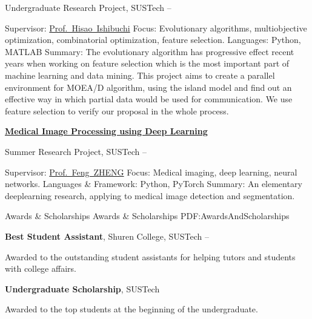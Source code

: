 \documentclass[a4paper,MMMyyyy,nonstopmode]{simpleresumecv}
\begin{document}
\begin{Body}
\BulletItem
Undergraduate Research Project, SUSTech
\hfill
{} --
\begin{Detail}
\SubBulletItem
Supervisor:
\href{http://cse.sustech.edu.cn/faculty/~hisao/}{Prof.~Hisao~Ishibuchi}
\SubBulletItem
Focus:
Evolutionary algorithms, multiobjective optimization, combinatorial optimization, feature selection.
\SubBulletItem
Languages: Python, MATLAB
\SubBulletItem
Summary:
The evolutionary algorithm has progressive effect recent years when working on feature selection which is the most important part of machine learning and data mining. This project aims to create a parallel environment for MOEA/D algorithm, using the island model and find out an effective way in which partial data would be used for communication. We use feature selection to verify our proposal in the whole process.
\end{Detail}

\Gap
\Entry
\href{https://github.com/hackroid/cv-xmp}
{\textbf{Medical Image Processing using Deep Learning}}

\BulletItem
Summer Research Project, SUSTech
\hfill
{} --
\begin{Detail}
\SubBulletItem
Supervisor:
\href{https://faculty.sustech.edu.cn/fengzheng/en/}{Prof.~Feng~ZHENG}
\SubBulletItem
Focus:
Medical imaging, deep learning, neural networks.
\SubBulletItem
Languages \& Framework: Python, PyTorch
\SubBulletItem
Summary:
An elementary deeplearning research, applying to medical image detection and segmentation.
\end{Detail}



\Section
{Awards \&\newline
Scholarships}
{Awards \& Scholarships}
{PDF:AwardsAndScholarships}

\BulletItem
\textbf{Best Student Assistant},
Shuren College,
SUSTech
\hfill
{} --
\begin{Detail}
\Item
Awarded to the outstanding student assistants for helping tutors and students with college affairs.
\end{Detail}

\Gap
\BulletItem
\textbf{Undergraduate Scholarship},
SUSTech
\hfill
{}
\begin{Detail}
\Item
Awarded to the top students at the beginning of the undergraduate.
\end{Detail}



\end{Body}
\end{document}

